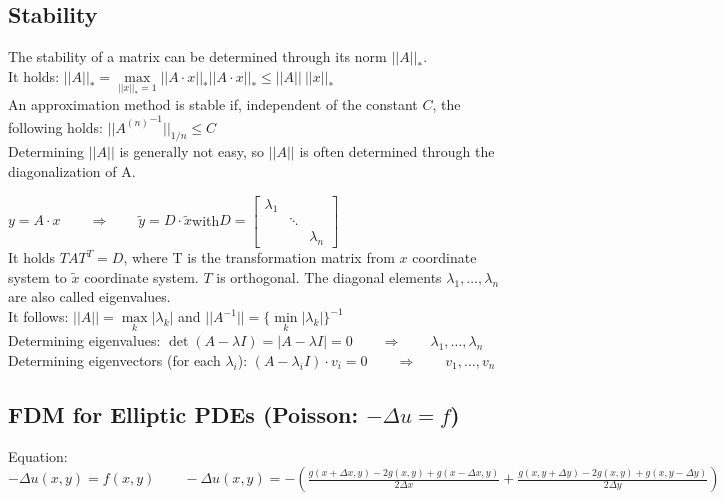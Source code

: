 \subsection{Stability}
The stability of a matrix can be determined through its norm $||A||_*$.\\

It holds: $||A||_*=\max\limits_{||x||_*=1}||A\cdot x||_*$\qquad$||A\cdot x||_*\leq||A||~||x||_*$\\

An approximation method is stable if, independent of the constant $C$, the following holds:
$\boxed{||{A^{(n)}}^{-1}||_{1/n}\leq C}$\\

Determining $||A||$ is generally not easy, so $||A||$ is often determined through the diagonalization of A.

$y=A\cdot x\qquad\Rightarrow\qquad\tilde{y}=D\cdot\tilde{x}$\qquad with\qquad $D=\begin{bmatrix}\lambda_1&&\\&\ddots&\\&&\lambda_n\end{bmatrix}$\\

It holds $TAT^T=D$, where T is the transformation matrix from $x$ coordinate system to $\tilde{x}$ coordinate system. $T$ is orthogonal.
The diagonal elements $\lambda_1,\ldots,\lambda_n$ are also called eigenvalues.\\

It follows: $\boxed{||A||=\max\limits_{k}|\lambda_k|}$ and $\boxed{||A^{-1}||=\{\min\limits_{k}|\lambda_k|\}^{-1}}$\\

Determining eigenvalues: $\boxed{\det(A-\lambda I)=|A-\lambda I|=0}\qquad \Rightarrow \qquad \lambda_1,\ldots,\lambda_n$\\
Determining eigenvectors (for each $\lambda_i$): $(A-\lambda_i I) \cdot v_i=0\qquad \Rightarrow \qquad v_1,\ldots,v_n$\\

\subsection{FDM for Elliptic PDEs (Poisson: $-\Delta u = f$)}

Equation:    $-\Delta u(x,y)= f(x,y) \qquad
-\Delta u(x,y) = -\left(\frac{g(x+\Delta x,y ) -2 g(x,y)+ g(x-\Delta x,y)}{2\Delta x} +
\frac{g(x,y+\Delta y) -2 g(x,y)+ g(x,y-\Delta y)}{2\Delta y}\right)$\\

